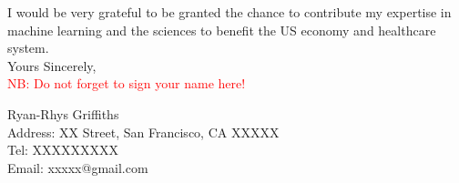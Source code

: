 \documentclass[11pt]{article}
\begin{document}
I would be very grateful to be granted the chance to contribute my expertise in machine learning and the sciences to benefit the US economy and healthcare system. \\

Yours Sincerely,\\

\textcolor{red}{NB: Do not forget to sign your name here!}

\vspace{1.5em}
Ryan-Rhys Griffiths\\

Address: XX Street, San Francisco, CA XXXXX\\
Tel: XXXXXXXXX \\
Email: xxxxx@gmail.com \\


\pagebreak


\renewcommand\refname{List of Exhibits}
\end{document}
